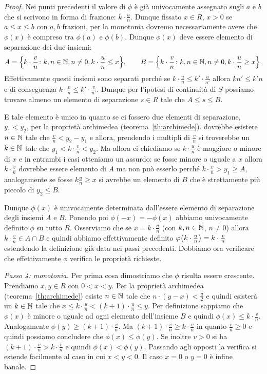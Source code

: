 \begin{proof}
Nei punti precedenti il valore di $\phi$ è già univocamente assegnato sugli $a$ e $b$ 
che si scrivono in forma di frazione: $k\cdot \frac u n$.
Dunque fissato $x\in R$, $x>0$ 
se $a \le x \le b$ con $a,b$ frazioni, 
per la monotonia 
dovremo necessariamente avere che $\phi(x)$ è 
compreso tra $\phi(a)$ e $\phi(b)$.
Dunque $\phi(x)$ deve essere elemento di separazione 
dei due insiemi:
\[
A = {\left\{ k \cdot \frac v n \colon k,n\in {\mathbb N}, n\neq 0, k\cdot \frac u n \le x  \right\}},\qquad
B = {\left\{ k \cdot \frac v n \colon k,n\in {\mathbb N}, n\neq 0, k\cdot \frac u n \ge x \right\}}.
\]
Effettivamente questi insiemi sono separati 
perché se $k\cdot \frac u n \le k'\cdot \frac u {n'}$ allora $kn'\le k'n$ 
e di conseguenza $k\cdot \frac v n \le k' \cdot \frac v {n'}$.
Dunque per l'ipotesi di continuità di $S$ 
possiamo trovare almeno un elemento di separazione $s\in R$ 
tale che $A\le s \le B$.

E tale elemento è unico in quanto se ci fossero due elementi di separazione, 
$y_1<y_2$, per la proprietà archimedea (teorema~\ref{th:archimede}).
dovrebbe esistere $n\in {\mathbb N}$ tale che $\frac v n < y_2-y_1$
e allora, prendendo i multipli di $\frac v n$ si troverebbe un $k\in{\mathbb N}$ 
tale che $y_1 < k\cdot \frac v n < y_2$. 
Ma allora ci chiediamo se $k\cdot \frac u n$ è maggiore o minore di $x$ e 
in entrambi i casi otteniamo un assurdo: se fosse minore o uguale a $x$ 
allora $k\cdot \frac v n$ dovrebbe essere elemento di $A$ ma non può esserlo 
perché $k\cdot \frac v n>y_1\ge A$, 
analogamente se fosse $k\frac u n \ge x$ 
si avrebbe un elemento di $B$ che è strettamente più piccolo di $y_2\le B$.

Dunque $\phi(x)$ è univocamente determinata dall'essere elemento di 
separazione degli insiemi $A$ e $B$.
Ponendo poi $\phi(-x) = -\phi(x)$ abbiamo univocamente definito $\phi$ 
su tutto $R$. 
Osserviamo che se $x=k\cdot \frac u n$ (con $k,n\in {\mathbb N}$, $n\neq 0$)
allora $k\cdot \frac v n \in A\cap B$ e quindi abbiamo effettivamente 
definito $\varphi{\left( k\cdot \frac u n \right)} = k\cdot \frac v n$ estendendo la definizione 
già data nei passi precedenti.
Dobbiamo ora verificare che effettivamente $\phi$ 
verifica le proprietà richieste.

\emph{Passo 4: monotonia.}
Per prima cosa dimostriamo che $\phi$ risulta essere crescente. 
Prendiamo $x,y\in R$ con $0<x<y$.
Per la proprietà archimedea (teorema~\ref{th:archimede})
esiste $n\in {\mathbb N}$ tale che $n\cdot(y-x) < \frac u 2$ 
e quindi esisterà un $k\in {\mathbb N}$ 
tale che $x \le k \cdot \frac u n < (k+1)\cdot \frac u n \le y$.
Per definizione sappiamo che $\phi(x)$ è minore o uguale ad ogni 
elemento dell'insieme $B$ e quindi $\phi(x) \le k\cdot \frac v n$.
Analogamente $\phi(y) \ge (k+1)\cdot \frac v n$. 
Ma $(k+1)\cdot \frac v n \ge k\cdot \frac v n$ in quanto $\frac v n\ge 0$ 
e quindi possiamo concludere che $\phi(x) \le \phi(y)$.
Se inoltre $v>0$ si ha $(k+1)\cdot \frac v n > k\cdot \frac v n$
e quindi $\phi(x) < \phi(y)$.
Passando agli opposti la verifica si estende facilmente al caso in cui $x<y<0$.
Il caso $x= 0$ o $y=0$ è infine banale.


\end{proof}
